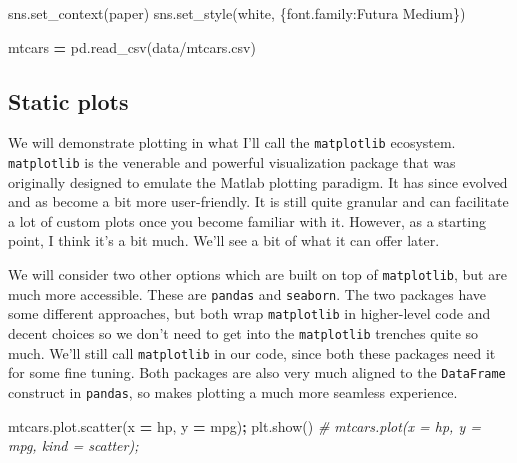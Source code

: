 \documentclass[
  letterpaper,
]{scrbook}
\newenvironment{Shaded}{\begin{snugshade}}{\end{snugshade}}
\newcommand{\CommentTok}[1]{\textcolor[rgb]{0.56,0.35,0.01}{\textit{#1}}}
\newcommand{\NormalTok}[1]{#1}
\newcommand{\OperatorTok}[1]{\textcolor[rgb]{0.81,0.36,0.00}{\textbf{#1}}}
\newcommand{\StringTok}[1]{\textcolor[rgb]{0.31,0.60,0.02}{#1}}
\begin{document}
\begin{Shaded}
\begin{Highlighting}[]
\NormalTok{sns.set\_context(}\StringTok{\textquotesingle{}paper\textquotesingle{}}\NormalTok{)}
\NormalTok{sns.set\_style(}\StringTok{\textquotesingle{}white\textquotesingle{}}\NormalTok{, \{}\StringTok{\textquotesingle{}font.family\textquotesingle{}}\NormalTok{:}\StringTok{\textquotesingle{}Futura Medium\textquotesingle{}}\NormalTok{\})}
\end{Highlighting}
\end{Shaded}

\begin{Shaded}
\begin{Highlighting}[]
\NormalTok{mtcars }\OperatorTok{=}\NormalTok{ pd.read\_csv(}\StringTok{\textquotesingle{}data/mtcars.csv\textquotesingle{}}\NormalTok{)}
\end{Highlighting}
\end{Shaded}

\hypertarget{static-plots}{%
\subsection{Static plots}\label{static-plots}}

We will demonstrate plotting in what I'll call the \texttt{matplotlib} ecosystem. \texttt{matplotlib} is the venerable and powerful visualization package that was originally designed to emulate the Matlab plotting paradigm. It has since evolved and as become a bit more user-friendly. It is still quite granular and can facilitate a lot of custom plots once you become familiar with it. However, as a starting point, I think it's a bit much. We'll see a bit of what it can offer later.

We will consider two other options which are built on top of \texttt{matplotlib}, but are much more accessible. These are \texttt{pandas} and \texttt{seaborn}. The two packages have some different approaches, but both wrap \texttt{matplotlib} in higher-level code and decent choices so we don't need to get into the \texttt{matplotlib} trenches quite so much. We'll still call \texttt{matplotlib} in our code, since both these packages need it for some fine tuning. Both packages are also very much aligned to the \texttt{DataFrame} construct in \texttt{pandas}, so makes plotting a much more seamless experience.

\begin{Shaded}
\begin{Highlighting}[]
\NormalTok{mtcars.plot.scatter(x }\OperatorTok{=} \StringTok{\textquotesingle{}hp\textquotesingle{}}\NormalTok{, y }\OperatorTok{=} \StringTok{\textquotesingle{}mpg\textquotesingle{}}\NormalTok{)}\OperatorTok{;}
\NormalTok{plt.show()}
\CommentTok{\# mtcars.plot(x = \textquotesingle{}hp\textquotesingle{}, y = \textquotesingle{}mpg\textquotesingle{}, kind = \textquotesingle{}scatter\textquotesingle{});}
\end{Highlighting}
\end{Shaded}
\end{document}
